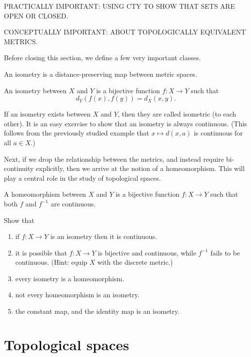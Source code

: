 \documentclass[draft]{penrose}
\begin{document}
PRACTICALLY IMPORTANT: USING CTY TO SHOW THAT SETS ARE OPEN OR CLOSED.

CONCEPTUALLY IMPORTANT: ABOUT TOPOLOGICALLY EQUIVALENT METRICS.

Before closing this section, we define a few very important classes.

An isometry is a distance-preserving map between metric spaces.
\begin{ndfn}[Isometry]
  An isometry between $X$ and $Y$ is a bijective function $f:X \to Y$ such that
  \begin{equation*}
    d_{Y}(f(x), f(y)) = d_{X}(x, y).
  \end{equation*}
\end{ndfn}
If an isometry exists between $X$ and $Y$, then they are called isometric (to each other). It is an easy exercise to show that an isometry is always continuous. (This follows from the previously studied example that $x \mapsto d(x,a)$ is continuous for all $a \in X$.)

Next, if we drop the relationship between the metrics, and instead require bi-continuity explicitly, then we arrive at the notion of a homeomorphism. This will play a central role in the study of topological spaces.
\begin{ndfn}[Homeomorphism]
  A homeomorphism between $X$ and $Y$ is a bijective function $f:X \to Y$ such that both $f$ and $f^{-1}$ are continuous.
\end{ndfn}

\begin{exercise}
Show that
\begin{enumerate}
\item if $f: X \to Y$ is an isometry then it is continuous.
\item it is possible that $f: X \to Y$ is bijective and continuous, while $f^{-1}$ fails to be continuous. (Hint: equip $X$ with the discrete metric.)
\item every isometry is a homeomorphism.
\item not every homeomorphism is an isometry.
\item the constant map, and the identity map is an isometry.
\end{enumerate}
\end{exercise}

\section{Topological spaces}
\end{document}
